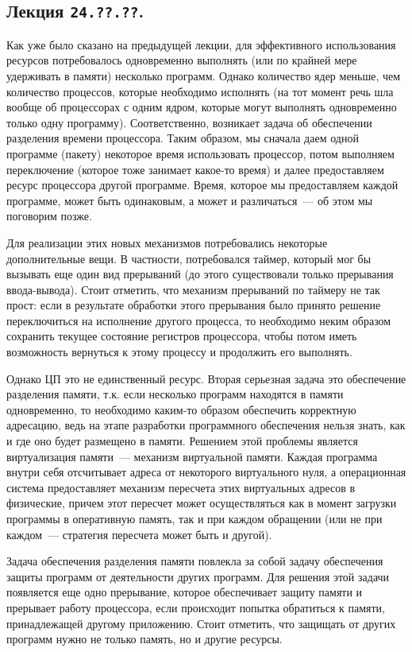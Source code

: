 \subsection{%
  Лекция \texttt{24.??.??}.%
}

Как уже было сказано на предыдущей лекции, для эффективного использования
ресурсов потребовалось одновременно выполнять (или по крайней мере удерживать в
памяти) несколько программ. Однако количество ядер меньше, чем количество
процессов, которые необходимо исполнять (на тот момент речь шла вообще об
процессорах с одним ядром, которые могут выполнять одновременно только одну
программу). Соответственно, возникает задача об обеспечении разделения времени
процессора. Таким образом, мы сначала даем одной программе (пакету) некоторое
время использовать процессор, потом выполняем переключение (которое тоже
занимает какое-то время) и далее предоставляем ресурс процессора другой
программе. Время, которое мы предоставляем каждой программе, может быть
одинаковым, а может и различаться~--- об этом мы поговорим позже.

Для реализации этих новых механизмов потребовались некоторые дополнительные
вещи. В частности, потребовался таймер, который мог бы вызывать еще один вид
прерываний (до этого существовали только прерывания ввода-вывода). Стоит
отметить, что механизм прерываний по таймеру не так прост: если в результате
обработки этого прерывания было принято решение переключиться на исполнение
другого процесса, то необходимо неким образом сохранить текущее состояние
регистров процессора, чтобы потом иметь возможность вернуться к этому процессу
и продолжить его выполнять.

Однако ЦП это не единственный ресурс. Вторая серьезная задача это обеспечение
разделения памяти, т.к. если несколько программ находятся в памяти одновременно,
то необходимо каким-то образом обеспечить корректную адресацию, ведь на этапе
разработки программного обеспечения нельзя знать, как и где оно будет размещено
в памяти. Решением этой проблемы является виртуализация памяти~--- механизм
виртуальной памяти. Каждая программа внутри себя отсчитывает адреса от
некоторого виртуального нуля, а операционная система предоставляет механизм
пересчета этих виртуальных адресов в физические, причем этот пересчет может
осуществляться как в момент загрузки программы в оперативную память, так и при
каждом обращении (или не при каждом~--- стратегия пересчета может быть и
другой).

Задача обеспечения разделения памяти повлекла за собой задачу обеспечения защиты
программ от деятельности других программ. Для решения этой задачи появляется еще
одно прерывание, которое обеспечивает защиту памяти и прерывает работу
процессора, если происходит попытка обратиться к памяти, принадлежащей другому
приложению. Стоит отметить, что защищать от других программ нужно не только
память, но и другие ресурсы.

